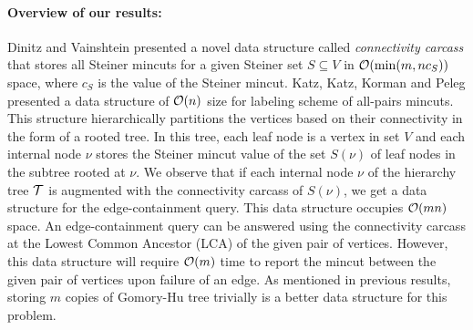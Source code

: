 \noindent



\paragraph{Overview of our results:} Dinitz and Vainshtein \cite{DBLP:conf/stoc/DinitzV94,DBLP:journals/siamcomp/DinitzV00}
presented a novel data structure called {\em connectivity carcass} that stores all Steiner mincuts for a given Steiner set $S\subseteq V$ in ${\cal O}(\min(m,nc_S))$ space, where $c_S$ is the value of the Steiner mincut. %
Katz, Katz, Korman and Peleg \cite{DBLP:journals/siamcomp/KatzKKP04} presented a data structure of ${\cal O}(n)$ size for labeling scheme of all-pairs mincuts. This structure hierarchically partitions the vertices based on their connectivity in the form of a rooted tree. In this tree, each leaf node is a vertex in set $V$ and each internal node $\nu$ stores the Steiner mincut value of the set $S(\nu)$ of leaf nodes in the subtree rooted at $\nu$. %
We observe that if each internal node $\nu$ of the hierarchy tree ${\cal T}$
is augmented with the connectivity carcass of $S(\nu)$, we get a data structure for the edge-containment query. This data structure occupies ${\cal O}(mn)$ space. An edge-containment query can be answered using the connectivity carcass at the Lowest Common Ancestor (LCA) of the given pair of vertices. However, this data structure will require ${\cal O}(m)$ time to report the mincut between the given pair of vertices upon failure of an edge. As mentioned in previous results, storing $m$ copies of Gomory-Hu tree trivially is a better data structure for this problem.

